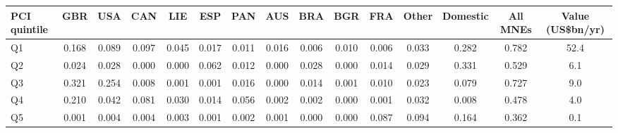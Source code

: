 \begin{tabular}{lcccccccccccccc}
\toprule
PCI quintile & GBR & USA & CAN & LIE & ESP & PAN & AUS & BRA & BGR & FRA & Other & Domestic & All MNEs & Value (US\$bn/yr) \\
\midrule
Q1 & 0.168 & 0.089 & 0.097 & 0.045 & 0.017 & 0.011 & 0.016 & 0.006 & 0.010 & 0.006 & 0.033 & 0.282 & 0.782 & 52.4 \\
Q2 & 0.024 & 0.028 & 0.000 & 0.000 & 0.062 & 0.012 & 0.000 & 0.028 & 0.000 & 0.014 & 0.029 & 0.331 & 0.529 & 6.1 \\
Q3 & 0.321 & 0.254 & 0.008 & 0.001 & 0.001 & 0.016 & 0.000 & 0.014 & 0.001 & 0.010 & 0.023 & 0.079 & 0.727 & 9.0 \\
Q4 & 0.210 & 0.042 & 0.081 & 0.030 & 0.014 & 0.056 & 0.002 & 0.002 & 0.000 & 0.001 & 0.032 & 0.008 & 0.478 & 4.0 \\
Q5 & 0.001 & 0.004 & 0.004 & 0.003 & 0.001 & 0.002 & 0.001 & 0.000 & 0.000 & 0.087 & 0.094 & 0.164 & 0.362 & 0.1 \\
\bottomrule
\end{tabular}
